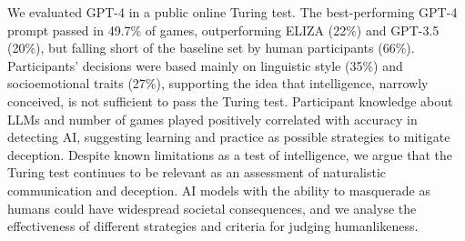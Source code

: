 We evaluated GPT-4 in a public online Turing test. The best-performing GPT-4 prompt passed in 49.7\% of games, outperforming ELIZA (22\%) and GPT-3.5 (20\%), but falling short of the baseline set by human participants (66\%). Participants' decisions were based mainly on linguistic style (35\%) and socioemotional traits (27\%), supporting the idea that intelligence, narrowly conceived, is not sufficient to pass the Turing test. Participant knowledge about LLMs and number of games played positively correlated with accuracy in detecting AI, suggesting learning and practice as possible strategies to mitigate deception. Despite known limitations as a test of intelligence, we argue that the Turing test continues to be relevant as an assessment of naturalistic communication and deception. AI models with the ability to masquerade as humans could have widespread societal consequences, and we analyse the effectiveness of different strategies and criteria for judging humanlikeness.